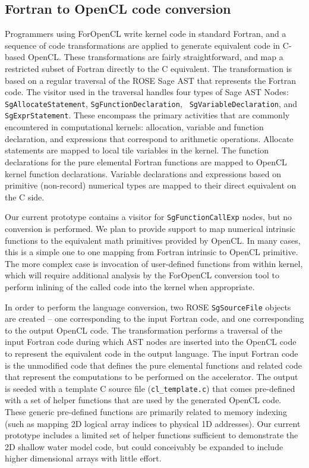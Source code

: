 \subsection{Fortran to OpenCL code conversion}

Programmers using ForOpenCL write kernel code in standard Fortran, and
a sequence of code transformations are applied to generate equivalent
code in C-based OpenCL.  These transformations are fairly
straightforward, and map a restricted subset of Fortran directly to
the C equivalent.  The transformation is based on a regular traversal
of the ROSE Sage AST that represents the Fortran code.  The visitor
used in the traversal handles four types of Sage AST Nodes: {\tt
  SgAllocateStatement}, {\tt SgFunctionDeclaration}, {\tt
  SgVariableDeclaration}, and {\tt SgExprStatement}.  These encompass
the primary activities that are commonly encountered in computational
kernels: allocation, variable and function declaration, and
expressions that correspond to arithmetic operations.  Allocate
statements are mapped to local tile variables in the kernel.  The
function declarations for the pure elemental Fortran functions are
mapped to OpenCL kernel function declarations.  Variable declarations and
expressions based on primitive (non-record) numerical types are mapped
to their direct equivalent on the C side.  

Our current prototype contains a visitor for {\tt SgFunctionCallExp}
nodes, but no conversion is performed.  We plan to provide support to
map numerical intrinsic functions to the equivalent math primitives
provided by OpenCL.  In many cases, this is a simple one to one
mapping from Fortran intrinsic to OpenCL primitive.  The more complex
case is invocation of user-defined functions from within kernel, which
will require additional analysis by the ForOpenCL conversion tool to
perform inlining of the called code into the kernel when appropriate.

In order to perform the language conversion, two ROSE {\tt SgSourceFile}
objects are created -- one corresponding to the input Fortran code, and
one corresponding to the output OpenCL code.  The transformation performs
a traversal of the input Fortran code during which AST nodes are inserted
into the OpenCL code to represent the equivalent code in the output language.
The input Fortran code is the unmodified code that defines the pure
elemental functions and related code that represent the computations to be
performed on the accelerator.  The output is seeded with a template C
source file ({\tt cl\_template.c}) that comes pre-defined with a set of
helper functions that are used by the generated OpenCL code.  These
generic pre-defined functions are primarily related to memory indexing (such
as mapping 2D logical array indices to physical 1D addresses).  Our current
prototype includes a limited set of helper functions sufficient to demonstrate
the 2D shallow water model code, but could conceivably be expanded to include
higher dimensional arrays with little effort.
